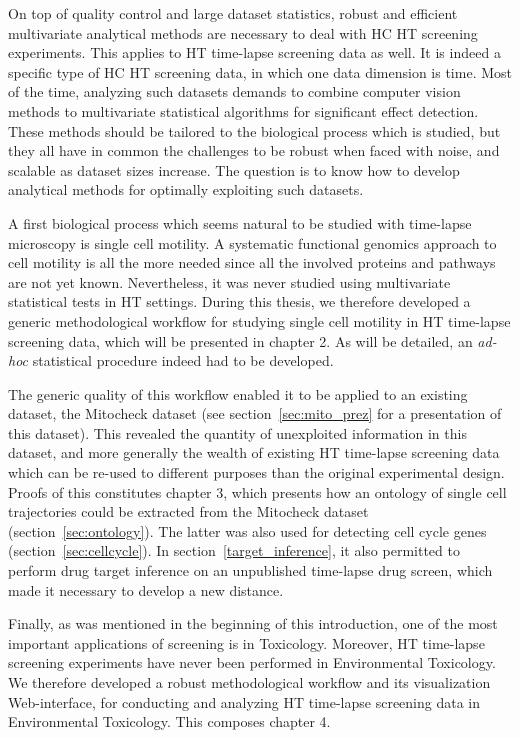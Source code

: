 On top of quality control and large dataset statistics, robust and efficient multivariate analytical methods are necessary to deal with HC HT screening experiments. This applies to HT time-lapse screening data as well. It is indeed a specific type of HC HT screening data, in which one data dimension is time. Most of the time, analyzing such datasets demands to combine computer vision methods to multivariate statistical algorithms for significant effect detection. These methods should be tailored to the biological process which is studied, but they all have in common the challenges to be robust when faced with noise, and scalable as dataset sizes increase. The question is to know how to develop analytical methods for optimally exploiting such datasets.

A first biological process which seems natural to be studied with time-lapse microscopy is single cell motility. A systematic functional genomics approach to cell motility is all the more needed since all the involved proteins and pathways are not yet known. Nevertheless, it was never studied using multivariate statistical tests in HT settings. During this thesis, we therefore developed a generic methodological workflow for studying single cell motility in HT time-lapse screening data, which will be presented in chapter 2. As will be detailed, an \textit{ad-hoc} statistical procedure indeed had to be developed.

The generic quality of this workflow enabled it to be applied to an existing dataset, the Mitocheck dataset (see section~\ref{sec:mito_prez} for a presentation of this dataset). This revealed the quantity of unexploited information in this dataset, and more generally the wealth of existing HT time-lapse screening data which can be re-used to different purposes than the original experimental design. Proofs of this constitutes chapter 3, which presents how an ontology of single cell trajectories could be extracted from the Mitocheck dataset (section~\ref{sec:ontology}). The latter was also used for detecting cell cycle genes (section~\ref{sec:cellcycle}). In section~\ref{target_inference}, it also permitted to perform drug target inference on an unpublished time-lapse drug screen, which made it necessary to develop a new distance.

Finally, as was mentioned in the beginning of this introduction, one of the most important applications of screening is in Toxicology. Moreover, HT time-lapse screening experiments have never been performed in Environmental Toxicology. We therefore developed a robust methodological workflow and its visualization Web-interface, for conducting and analyzing HT time-lapse screening data in Environmental Toxicology. This composes chapter 4.


